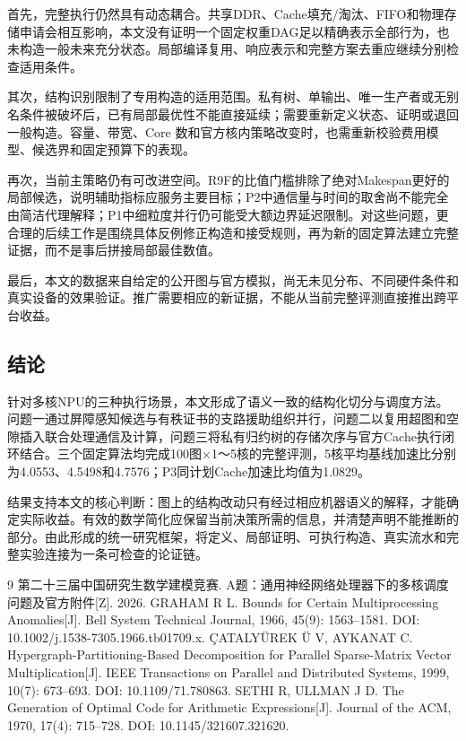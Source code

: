 \documentclass[anonymous,notoc]{gmcm2026}
\begin{document}
首先，完整执行仍然具有动态耦合。共享DDR、Cache填充/淘汰、FIFO和物理存储申请会相互影响，本文没有证明一个固定权重DAG足以精确表示全部行为，也未构造一般未来充分状态。局部编译复用、响应表示和完整方案去重应继续分别检查适用条件。

其次，结构识别限制了专用构造的适用范围。私有树、单输出、唯一生产者或无别名条件被破坏后，已有局部最优性不能直接延续；需要重新定义状态、证明或退回一般构造。容量、带宽、Core 数和官方核内策略改变时，也需重新校验费用模型、候选界和固定预算下的表现。

再次，当前主策略仍有可改进空间。R9F的比值门槛排除了绝对Makespan更好的局部候选，说明辅助指标应服务主要目标；P2中通信量与时间的取舍尚不能完全由简洁代理解释；P1中细粒度并行仍可能受大额边界延迟限制。对这些问题，更合理的后续工作是围绕具体反例修正构造和接受规则，再为新的固定算法建立完整证据，而不是事后拼接局部最佳数值。

最后，本文的数据来自给定的公开图与官方模拟，尚无未见分布、不同硬件条件和真实设备的效果验证。推广需要相应的新证据，不能从当前完整评测直接推出跨平台收益。

\subsection{结论}\label{ux7ed3ux8bba}

针对多核NPU的三种执行场景，本文形成了语义一致的结构化切分与调度方法。问题一通过屏障感知候选与有秩证书的支路援助组织并行，问题二以复用超图和空隙插入联合处理通信及计算，问题三将私有归约树的存储次序与官方Cache执行闭环结合。三个固定算法均完成100图×1～5核的完整评测，5核平均基线加速比分别为4.0553、4.5498和4.7576；P3同计划Cache加速比均值为1.0829。

结果支持本文的核心判断：图上的结构改动只有经过相应机器语义的解释，才能确定实际收益。有效的数学简化应保留当前决策所需的信息，并清楚声明不能推断的部分。由此形成的统一研究框架，将定义、局部证明、可执行构造、真实流水和完整实验连接为一条可检查的论证链。

\FloatBarrier
\begin{thebibliography}{9}
 第二十三届中国研究生数学建模竞赛. A题：通用神经网络处理器下的多核调度问题及官方附件[Z]. 2026.
 GRAHAM R L. Bounds for Certain Multiprocessing Anomalies[J]. Bell System Technical Journal, 1966, 45(9): 1563--1581. DOI: 10.1002/j.1538-7305.1966.tb01709.x.
 ÇATALYÜREK Ü V, AYKANAT C. Hypergraph-Partitioning-Based Decomposition for Parallel Sparse-Matrix Vector Multiplication[J]. IEEE Transactions on Parallel and Distributed Systems, 1999, 10(7): 673--693. DOI: 10.1109/71.780863.
 SETHI R, ULLMAN J D. The Generation of Optimal Code for Arithmetic Expressions[J]. Journal of the ACM, 1970, 17(4): 715--728. DOI: 10.1145/321607.321620.
\end{thebibliography}
\end{document}
